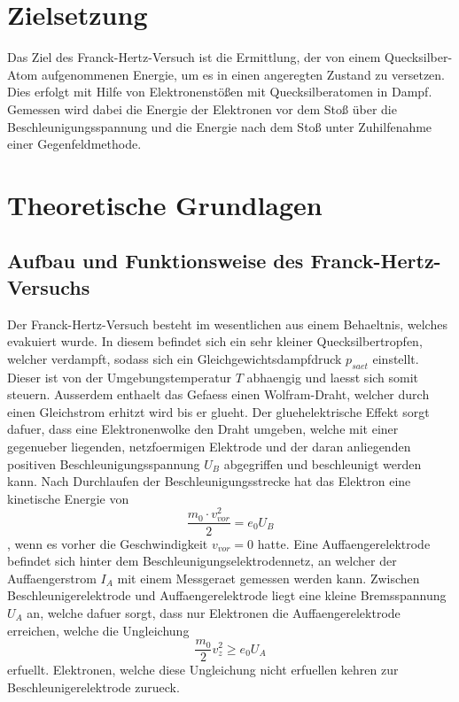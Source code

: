 \section{Zielsetzung}
Das Ziel des Franck-Hertz-Versuch ist die Ermittlung, der von einem Quecksilber-Atom aufgenommenen Energie, um es in einen angeregten Zustand zu versetzen. Dies erfolgt mit Hilfe von Elektronenstößen mit Quecksilberatomen in Dampf. Gemessen wird dabei die Energie der Elektronen vor dem Stoß über die Beschleunigungsspannung und die Energie nach dem Stoß unter Zuhilfenahme einer Gegenfeldmethode. 
\section{Theoretische Grundlagen}
\subsection{Aufbau und Funktionsweise des Franck-Hertz-Versuchs}
Der Franck-Hertz-Versuch besteht im wesentlichen aus einem Behaeltnis, welches evakuiert wurde. In diesem befindet sich ein sehr kleiner Quecksilbertropfen, welcher verdampft, sodass sich ein Gleichgewichtsdampfdruck $p_{saet}$ einstellt. Dieser ist von der Umgebungstemperatur $T$ abhaengig und laesst sich somit steuern. Ausserdem enthaelt das Gefaess einen Wolfram-Draht, welcher durch einen Gleichstrom erhitzt wird bis er glueht. Der gluehelektrische Effekt sorgt dafuer, dass eine Elektronenwolke den Draht umgeben, welche mit einer gegenueber liegenden, netzfoermigen Elektrode und der daran anliegenden positiven Beschleunigungsspannung $U_B$ abgegriffen und beschleunigt werden kann. Nach Durchlaufen der Beschleunigungsstrecke hat das Elektron eine kinetische Energie von
\begin{equation}
    \frac{m_0\cdot v^2_{vor}}{2}=e_0U_B \nonumber
\end{equation}
, wenn es vorher die Geschwindigkeit $v_{vor}=0$ hatte. Eine Auffaengerelektrode befindet sich hinter dem Beschleunigungselektrodennetz, an welcher der Auffaengerstrom $I_A$ mit einem Messgeraet gemessen werden kann. Zwischen Beschleunigerelektrode und Auffaengerelektrode liegt eine kleine Bremsspannung $U_A$ an, welche dafuer sorgt, dass nur Elektronen die Auffaengerelektrode erreichen, welche die Ungleichung 
\begin{equation}
    \frac{m_0}{2}v^2_z\geq e_0U_A
\end{equation}
erfuellt. Elektronen, welche diese Ungleichung nicht erfuellen kehren zur Beschleunigerelektrode zurueck.
